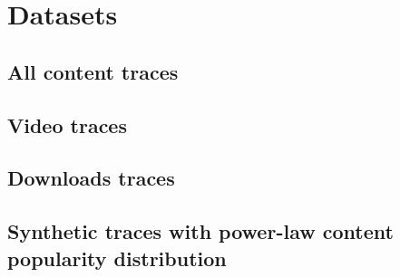 
\section{Datasets}


\subsection{All content traces}

\subsection{Video traces}

\subsection{Downloads traces}

\subsection{Synthetic traces with power-law content popularity distribution}